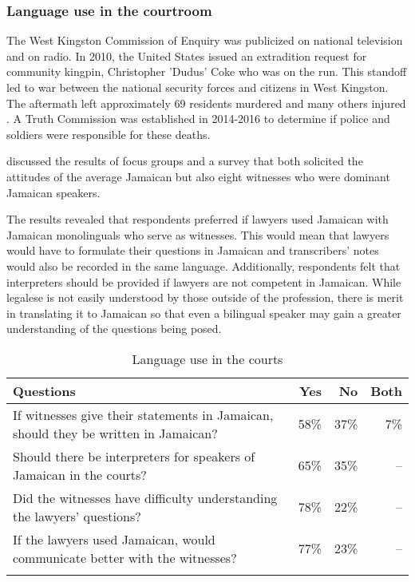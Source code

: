 \documentclass[output=paper,colorlinks,citecolor=brown]{langscibook}
\begin{document}
\subsubsection{Language use in the courtroom}

The West Kingston Commission of Enquiry was publicized on national television and on radio. In 2010, the United States issued an extradition request for community kingpin, Christopher 'Dudus' Coke who was on the run. This standoff led to war between the national security forces and citizens in West Kingston. The aftermath left approximately 69 residents murdered and many others injured \citep{Commission_of_Enquiry2016}. A Truth Commission was established in 2014-2016 to determine if police and soldiers were responsible for these deaths. 

\citet{Walters2017} discussed the results of focus groups and a survey that both solicited the attitudes of the average Jamaican but also eight witnesses who were dominant Jamaican speakers. 

\begin{sloppypar}
The results revealed that respondents preferred if lawyers used Jamaican with Jamaican monolinguals who serve as witnesses. This would mean that lawyers would have to formulate their questions in Jamaican and transcribers' notes would also be recorded in the same language. Additionally, respondents felt that interpreters should be provided if lawyers are not competent in Jamaican. While legalese is not easily understood by those outside of the profession, there is merit in translating it to Jamaican so that even a bilingual speaker may gain a greater understanding of the questions being posed.
\end{sloppypar}

\begin{table}
\caption{Language use in the courts\label{tab:02:5}}
\begin{tabularx}{\textwidth}{Qrrr}
    \lsptoprule
    {Questions} & {Yes} & {No} & {Both}\\\midrule
    If witnesses give their statements in Jamaican, should they be written in Jamaican? & 58\% & 37\% & 7\%\\
    \tablevspace
    Should there be interpreters for speakers of Jamaican in the courts? & 65\% & 35\% & --\\
    \tablevspace
    Did the witnesses have difficulty understanding the lawyers' questions? & 78\% & 22\% & -- \\
    \tablevspace
    If the lawyers used	Jamaican, would communicate better with the witnesses? & 77\% & 23\% & --\\
    \lspbottomrule
\end{tabularx}
\end{table}
\end{document}
